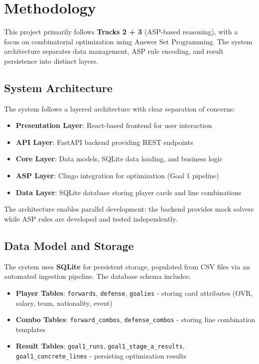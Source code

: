 \section{Methodology}

This project primarily follows \textbf{Tracks 2 + 3} (ASP-based reasoning), with a focus on combinatorial optimization using Answer Set Programming. The system architecture separates data management, ASP rule encoding, and result persistence into distinct layers.

\subsection{System Architecture}

The system follows a layered architecture with clear separation of concerns:

\begin{itemize}
    \item \textbf{Presentation Layer}: React-based frontend for user interaction
    \item \textbf{API Layer}: FastAPI backend providing REST endpoints
    \item \textbf{Core Layer}: Data models, SQLite data loading, and business logic
    \item \textbf{ASP Layer}: Clingo integration for optimization (Goal 1 pipeline)
    \item \textbf{Data Layer}: SQLite database storing player cards and line combinations
\end{itemize}

The architecture enables parallel development: the backend provides mock solvers while ASP rules are developed and tested independently.

\subsection{Data Model and Storage}

The system uses \textbf{SQLite} for persistent storage, populated from CSV files via an automated ingestion pipeline. The database schema includes:

\begin{itemize}
    \item \textbf{Player Tables}: \texttt{forwards}, \texttt{defense}, \texttt{goalies} - storing card attributes (OVR, salary, team, nationality, event)
    \item \textbf{Combo Tables}: \texttt{forward\_combos}, \texttt{defense\_combos} - storing line combination templates
    \item \textbf{Result Tables}: \texttt{goal1\_runs}, \texttt{goal1\_stage\_a\_results}, \texttt{goal1\_concrete\_lines} - persisting optimization results
\end{itemize}

